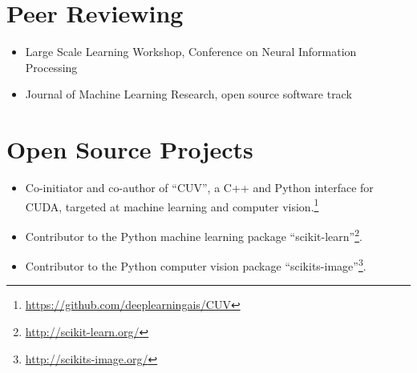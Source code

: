 \documentclass[a4paper,11pt]{article}
\begin{document}
\section{Peer Reviewing}
\begin{itemize}
    \item Large Scale Learning Workshop, Conference on Neural Information Processing
    \item Journal of Machine Learning Research, open source software track
\end{itemize}

\section{Open Source Projects}
\begin{itemize}
    \item Co-initiator and co-author of ``CUV'', a C++ and Python interface for CUDA,
        targeted at machine learning and computer vision.\footnote{\url{https://github.com/deeplearningais/CUV}}
    \item Contributor to the Python machine learning package ``scikit-learn''\footnote{\url{http://scikit-learn.org/}}.
    \item Contributor to the Python computer vision package ``scikits-image''\footnote{\url{http://scikits-image.org/}}.
\end{itemize}
\pagebreak

\begin{publications}
\end{publications}
\end{document}
